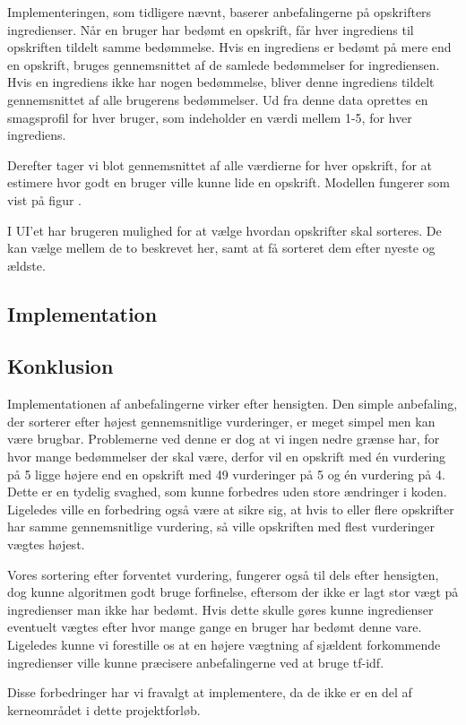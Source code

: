 Implementeringen, som tidligere nævnt, baserer anbefalingerne på opskrifters ingredienser.
Når en bruger har bedømt en opskrift, får hver ingrediens til opskriften tildelt samme bedømmelse.
Hvis en ingrediens er bedømt på mere end en opskrift, bruges gennemsnittet af de samlede bedømmelser for ingrediensen.
Hvis en ingrediens ikke har nogen bedømmelse, bliver denne ingrediens tildelt gennemsnittet af alle brugerens bedømmelser.
Ud fra denne data oprettes en smagsprofil for hver bruger, som indeholder en værdi mellem 1-5, for hver ingrediens.

Derefter tager vi blot gennemsnittet af alle værdierne for hver opskrift, for at estimere hvor godt en bruger ville kunne lide en opskrift.
Modellen fungerer som vist på figur .


I UI’et har brugeren mulighed for at vælge hvordan opskrifter skal sorteres.
De kan vælge mellem de to beskrevet her, samt at få sorteret dem efter nyeste og ældste.

\subsection{Implementation}
\subsection{Konklusion}
Implementationen af anbefalingerne virker efter hensigten.
Den simple anbefaling, der sorterer efter højest gennemsnitlige vurderinger, er meget simpel men kan være brugbar.
Problemerne ved denne er dog at vi ingen nedre grænse har, for hvor mange bedømmelser der skal være, derfor vil en opskrift med én vurdering på 5 ligge højere end en opskrift med 49 vurderinger på 5 og én vurdering på 4.
Dette er en tydelig svaghed, som kunne forbedres uden store ændringer i koden.
Ligeledes ville en forbedring også være at sikre sig, at hvis to eller flere opskrifter har samme gennemsnitlige vurdering, så ville opskriften med flest vurderinger vægtes højest.

Vores sortering efter forventet vurdering, fungerer også til dels efter hensigten, dog kunne algoritmen godt bruge forfinelse, eftersom der ikke er lagt stor vægt på ingredienser man ikke har bedømt.
Hvis dette skulle gøres kunne ingredienser eventuelt vægtes efter hvor mange gange en bruger har bedømt denne vare.
Ligeledes kunne vi forestille os at en højere vægtning af sjældent forkommende ingredienser ville kunne præcisere anbefalingerne ved at bruge tf-idf.

Disse forbedringer har vi fravalgt at implementere, da de ikke er en del af kerneområdet i dette projektforløb.
